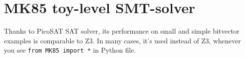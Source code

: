 \section{MK85 toy-level SMT-solver}

\renewcommand{\CURPATH}{solvers/MK85}

Thanks to PicoSAT SAT solver, its performance on small and simple bitvector examples is comparable to Z3.
In many cases, it's used instead of Z3, whenever you see \texttt{from MK85 import *} in Python file.





